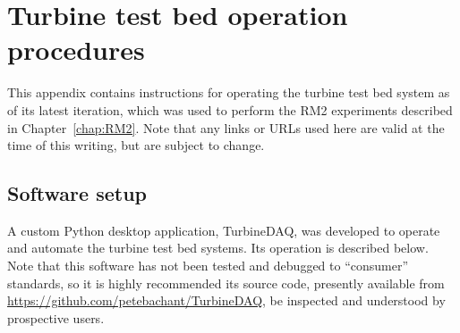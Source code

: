 \chapter{Turbine test bed operation procedures}
\doublespace

This appendix contains instructions for operating the turbine test bed system as
of its latest iteration, which was used to perform the RM2 experiments described
in Chapter~\ref{chap:RM2}. Note that any links or URLs used here are valid at
the time of this writing, but are subject to change.


\section{Software setup}

A custom Python desktop application, TurbineDAQ, was developed to operate and
automate the turbine test bed systems. Its operation is described below. Note
that this software has not been tested and debugged to ``consumer'' standards,
so it is highly recommended its source code, presently available from
\url{https://github.com/petebachant/TurbineDAQ}, be inspected and understood by
prospective users.





